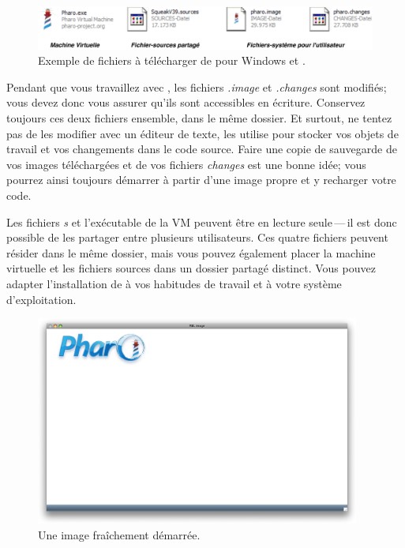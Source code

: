 \documentclass[a4paper,10pt,twoside]{book}
\begin{document}
\begin{figure}[htb]
\centerline {\includegraphics[width=\textwidth]{annotatedDownload-flat}}
\caption{Exemple de fichiers à télécharger de \pharo pour Windows et \macosx.}
\end{figure}

Pendant que vous travaillez avec \pharo, les fichiers \emph{.image} et \emph{.changes} sont modifiés; vous devez donc vous assurer qu'ils sont accessibles en écriture.
Conservez toujours ces deux fichiers ensemble, \cad dans le même dossier.
Et surtout, ne tentez pas de les modifier avec un éditeur de texte, \pharo les utilise pour stocker vos objets de travail et vos changements dans le code source.
Faire une copie de sauvegarde de vos images téléchargées et de vos
fichiers \emph{changes} est une bonne idée; vous pourrez ainsi
toujours démarrer à partir d'une image propre et y recharger votre code.

Les fichiers \emph{s} et l'exécutable de la VM peuvent être
en lecture seule\,---\,il est donc possible de les partager entre plusieurs utilisateurs.
Ces quatre fichiers peuvent résider dans le même dossier, mais vous pouvez également placer la machine virtuelle et les fichiers sources dans un dossier partagé distinct.
Vous pouvez adapter l'installation de \pharo à vos habitudes de travail
et à votre système d'exploitation.

\begin{figure}[htb]
\centerline {\includegraphics[width=0.95\textwidth]{startup}}
\caption{Une image \arevoir{\ppe} fraîchement démarrée.}
\end{figure}
\end{document}
